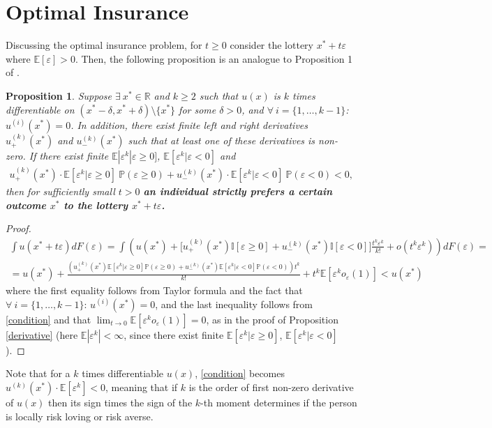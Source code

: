 \documentclass[a4paper]{article}
\newcommand{\prob}{\mathbb{P}}
\newcommand{\expect}{\mathbb{E}}
\newcommand{\eps}{\varepsilon}
\newtheorem{proposition}[theorem]{Proposition}
\begin{document}
\section{Optimal Insurance}\label{insurance}
Discussing the optimal insurance problem, for $t \ge 0$ consider the lottery $x^*+t \eps $ where \textbf{$\expect[\eps] > 0$}. Then, the following proposition is an analogue to Proposition 1 of \cite{segal1990first}.
\begin{proposition}\label{LRA}
	Suppose $\exists\ x^* \in \mathbb{R}$ and $k \ge 2$ such that $u(x)$ is $k$ times differentiable on $(x^*-\delta, x^*+\delta)\setminus\{x^*\}$ for some $\delta>0$, and $\forall\ i = \{1, \dots, k-1  \}$: $u^{(i)}(x^*) = 0$. In addition, there exist finite left and right derivatives $u^{(k)}_{+}(x^*)$ and $u^{(k)}_{-}(x^*)$ such that at least one of these derivatives is non-zero. If there exist finite $\expect| \eps^k |\eps\ge0]$, $\expect[ \eps^k |\eps<0]$ and \begin{align}\label{condition}
		u^{(k)}_{+}(x^*) \cdot \expect[ \eps^k | \eps\ge0]\ \prob(\eps\ge0) + u^{(k)}_{-}(x^*) \cdot \expect[ \eps^k | \eps<0]\ \prob(\eps<0) < 0,
		\end{align}
	then for sufficiently small $t > 0$ \textbf{an individual strictly prefers a certain outcome $x^*$ to the lottery $x^*+t\eps$.}
\end{proposition}
\begin{proof}
	\begin{align*}
		\int u(x^*+t\eps)dF(\eps) = \int \left( u(x^*) +  \bigg[u^{(k)}_{+}(x^*)\mathbb{I}[\eps\ge0]  + u^{(k)}_{-}(x^*)\mathbb{I}[\eps<0] \bigg] \frac{t^k \eps^k }{k!} +o(t^k \eps^k)\right)dF(\eps) = \\
	= u(x^*) + \frac{(u^{(k)}_{+}(x^*) \expect[\eps^k|\eps\ge 0]\prob(\eps\ge0)+u^{(k)}_{-}(x^*) \expect[\eps^k|\eps< 0]\prob(\eps<0))t^k}{k!} + t^k\expect[\eps^k o_{\eps}(1)] < u(x^*)
	\end{align*}
where the first equality follows from Taylor formula and the fact that $\forall\ i = \{1, \dots, k-1  \}$: $u^{(i)}(x^*) = 0$, and the last inequality follows from \eqref{condition} and that $\lim_{t\to0}\expect[\eps^ko_{\eps}(1)]=0$, as in the proof of Proposition \ref{derivative} (here $\expect|\eps^k| < \infty$, since there exist finite $\expect[ \eps^k |\eps\ge0]$, $\expect[ \eps^k |\eps<0]$).
\end{proof}
Note that for a $k$ times differentiable $u(x)$, \eqref{condition} becomes $u^{(k)}(x^*)\cdot\expect[\eps^k] < 0$, meaning that if $k$ is the order of first non-zero derivative of $u(x)$ then its sign times the sign of the $k$-th moment determines if the person is locally risk loving or risk averse. 
\end{document}
